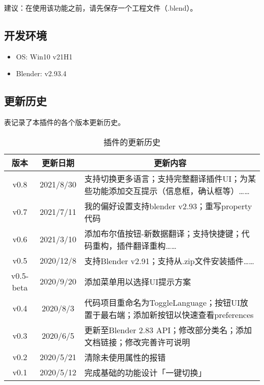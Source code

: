 \documentclass{../../PublicResources/DocClass}
\begin{document}
建议：在使用该功能之前，请先保存一个工程文件（.blend）。

\subsection{开发环境}
\begin{itemize}
    \item OS: Win10 v21H1
    \item Blender: v2.93.4
\end{itemize}

\newpage
\subsection{更新历史}
表记录了本插件的各个版本更新历史。
\begin{table}[h!]
    \centering
    \caption{插件的更新历史}
    \label{更新历史}
    \begin{tabular}{|*{2}{c|}m{305pt}|}
        \hline
        版本      & 更新日期  & \multicolumn{1}{c|}{更新内容}                                                       \\
        \hline
        v0.8      & 2021/8/30 & 支持切换更多语言；支持完整翻译插件UI；为某些功能添加交互提示（信息框，确认框等）……  \\
        \hline
        v0.7      & 2021/7/11 & 我的偏好设置支持blender v2.93；重写property代码                                     \\
        \hline
        v0.6      & 2021/3/10 & 添加布尔值按钮-新数据翻译；支持快捷键；代码重构，插件翻译重构……                     \\
        \hline
        v0.5      & 2020/12/8 & 支持Blender v2.91；支持从.zip文件安装插件……                                         \\
        \hline
        v0.5-beta & 2020/9/20 & 添加菜单用以选择UI提示方案                                                          \\
        \hline
        v0.4      & 2020/8/3  & 代码项目重命名为ToggleLanguage；按钮UI放置于最右端；添加新按钮以快速查看preferences \\
        \hline
        v0.3      & 2020/6/5  & 更新至Blender 2.83 API；修改部分类名；添加文档链接；修改完善许可说明                \\
        \hline
        v0.2      & 2020/5/21 & 清除未使用属性的报错                                                                \\
        \hline
        v0.1      & 2020/5/12 & 完成基础的功能设计「一键切换」                                                      \\
        \hline
    \end{tabular}
\end{table}
\end{document}
